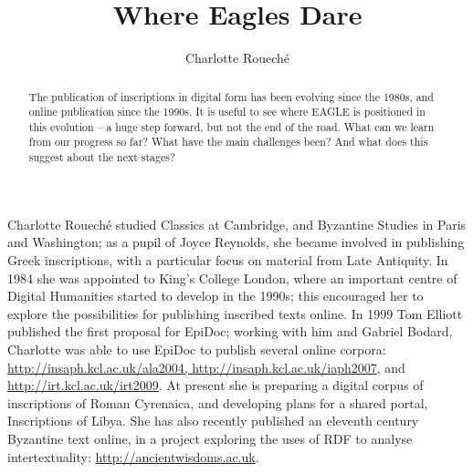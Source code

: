 \documentclass[amsthm,ebook]{saparticle}
\title{Where Eagles Dare}
\author[]{Charlotte Roueché\corref{first}}
\begin{document}
\maketitle
\begin{abstract}
The publication of inscriptions in digital form has been evolving since the 1980s, and online publication since the 1990s. It is useful to see where EAGLE is positioned in this evolution – a huge step forward, but not the end of the road. What can we learn from our progress so far? What have the main challenges been? And what does this suggest about the next stages?

\end{abstract}

Charlotte Roueché studied Classics at Cambridge, and Byzantine Studies in Paris and Washington; as a pupil of Joyce Reynolds, she became involved in publishing Greek inscriptions, with a particular focus on material from Late Antiquity. In 1984 she was appointed to King’s College London, where an important centre of Digital Humanities started to develop in the 1990s; this encouraged her to explore the possibilities for publishing inscribed texts online. In 1999 Tom Elliott published the first proposal for EpiDoc; working with him and Gabriel Bodard, Charlotte was able to use EpiDoc to publish several online corpora: \url{http://insaph.kcl.ac.uk/ala2004, http://insaph.kcl.ac.uk/iaph2007}, and \url{http://irt.kcl.ac.uk/irt2009}. At present she is preparing a digital corpus of inscriptions of Roman Cyrenaica, and developing plans for a shared portal, Inscriptions of Libya. She has also recently published an eleventh century Byzantine text online, in a project exploring the uses of RDF to analyse intertextuality: \url{http://ancientwisdoms.ac.uk}.
\end{document}
